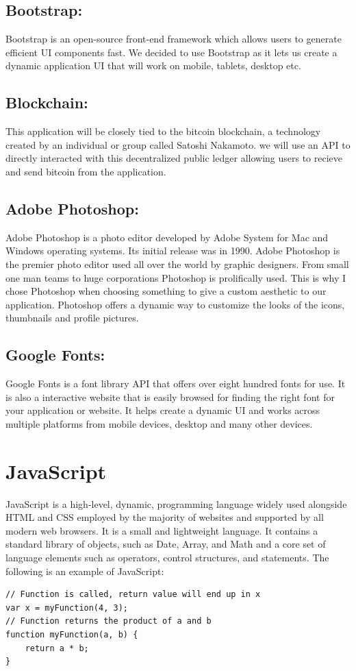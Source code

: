 \subsection{Bootstrap:}
Bootstrap is an open-source front-end framework which allows users to generate efficient UI components fast. We decided to use Bootstrap as it lets us create a dynamic application UI that will work on mobile, tablets, desktop etc.

\subsection{Blockchain:}
This application will be closely tied to the bitcoin blockchain, a technology created by an individual or group called Satoshi Nakamoto. we will use an API to directly interacted with this decentralized public ledger allowing users to recieve and send bitcoin from the application.

\subsection{Adobe Photoshop:}
Adobe Photoshop is a photo editor developed by Adobe System for Mac and Windows operating systems. Its initial release was in 1990. Adobe Photoshop is the premier photo editor used all over the world by graphic designers. From small one man teams to huge corporations Photoshop is prolifically used. This is why I chose Photoshop when choosing something to give a custom aesthetic to our application. Photoshop offers a dynamic way to customize the looks of the icons, thumbnails and profile pictures. 

\subsection{Google Fonts:}
Google Fonts is a font library API that offers over eight hundred fonts for use. It is also a interactive website that is easily browsed for finding the right font for your application or website. It helps create a dynamic UI and works across multiple platforms from mobile devices, desktop and many other devices.

\section{JavaScript}
JavaScript is a high-level, dynamic, programming language widely used alongside HTML and CSS employed by the majority of websites and supported by all modern web browsers. It is a small and lightweight language. It contains a standard library of objects, such as Date, Array, and Math and a core set of language elements such as operators, control structures, and statements\cite{Introduc25}.
The following is an example of JavaScript\cite{JavaScri59}:
\begin{lstlisting}
// Function is called, return value will end up in x
var x = myFunction(4, 3);   
// Function returns the product of a and b
function myFunction(a, b) {
    return a * b;   
}
\end{lstlisting}

